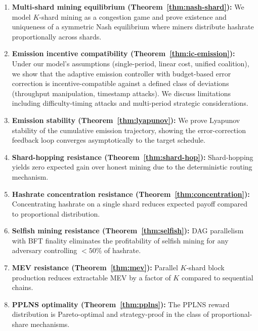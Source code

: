 \documentclass[11pt,a4paper]{article}
\theoremstyle{definition}
\theoremstyle{remark}
\begin{document}
\begin{enumerate}[leftmargin=*]
\item \textbf{Multi-shard mining equilibrium (Theorem~\ref{thm:nash-shard}):}
  We model $K$-shard mining as a congestion game and prove existence and
  uniqueness of a symmetric Nash equilibrium where miners distribute
  hashrate proportionally across shards.

\item \textbf{Emission incentive compatibility (Theorem~\ref{thm:ic-emission}):}
  Under our model's assumptions (single-period, linear cost, unified
  coalition), we show that the adaptive emission controller with
  budget-based error correction is incentive-compatible against a defined
  class of deviations (throughput manipulation, timestamp attacks).
  We discuss limitations including difficulty-timing attacks and
  multi-period strategic considerations.

\item \textbf{Emission stability (Theorem~\ref{thm:lyapunov}):}
  We prove Lyapunov stability of the cumulative emission trajectory,
  showing the error-correction feedback loop converges asymptotically
  to the target schedule.

\item \textbf{Shard-hopping resistance (Theorem~\ref{thm:shard-hop}):}
  Shard-hopping yields zero expected gain over honest mining due to
  the deterministic routing mechanism.

\item \textbf{Hashrate concentration resistance (Theorem~\ref{thm:concentration}):}
  Concentrating hashrate on a single shard reduces expected payoff
  compared to proportional distribution.

\item \textbf{Selfish mining resistance (Theorem~\ref{thm:selfish}):}
  DAG parallelism with BFT finality eliminates the profitability of
  selfish mining for any adversary controlling $< 50\%$ of hashrate.

\item \textbf{MEV resistance (Theorem~\ref{thm:mev}):}
  Parallel $K$-shard block production reduces extractable MEV by a
  factor of $K$ compared to sequential chains.

\item \textbf{PPLNS optimality (Theorem~\ref{thm:pplns}):}
  The PPLNS reward distribution is Pareto-optimal and strategy-proof
  in the class of proportional-share mechanisms.
\end{enumerate}
\end{document}
